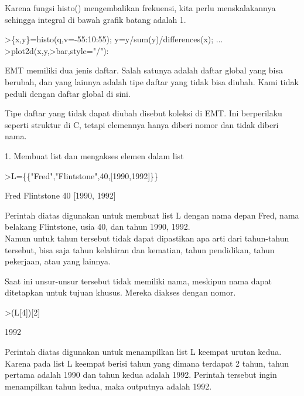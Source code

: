 \documentclass{article}
\begin{document}
\begin{eulernotebook}
\begin{eulercomment}
\begin{eulercomment}
\begin{eulercomment}
\begin{eulercomment}
\begin{eulercomment}
\begin{eulercomment}
\begin{eulercomment}
\begin{eulercomment}
\begin{eulercomment}
\begin{eulercomment}
\begin{eulercomment}
Karena fungsi histo() mengembalikan frekuensi, kita perlu
menskalakannya sehingga integral di bawah grafik batang adalah 1.
\end{eulercomment}
\begin{eulerprompt}
>\{x,y\}=histo(q,v=-55:10:55); y=y/sum(y)/differences(x); ...
>plot2d(x,y,>bar,style="/"):
\end{eulerprompt}
\begin{eulercomment}
\begin{eulercomment}
\begin{eulercomment}
EMT memiliki dua jenis daftar. Salah satunya adalah daftar global yang
bisa berubah, dan yang lainnya adalah tipe daftar yang tidak bisa
diubah. Kami tidak peduli dengan daftar global di sini.

Tipe daftar yang tidak dapat diubah disebut koleksi di EMT. Ini
berperilaku seperti struktur di C, tetapi elemennya hanya diberi nomor
dan tidak diberi nama.

1. Membuat list dan mengakses elemen dalam list
\end{eulercomment}
\begin{eulerprompt}
>L=\{\{"Fred","Flintstone",40,[1990,1992]\}\}
\end{eulerprompt}
\begin{euleroutput}
  Fred
  Flintstone
  40
  [1990,  1992]
\end{euleroutput}
\begin{eulercomment}
Perintah diatas digunakan untuk membuat list L dengan nama depan Fred,
nama belakang Flintstone, usia 40, dan tahun 1990, 1992.\\
Namun untuk tahun tersebut tidak dapat dipastikan apa arti dari
tahun-tahun tersebut, bisa saja tahun kelahiran dan kematian, tahun
pendidikan, tahun pekerjaan, atau yang lainnya.

Saat ini unsur-unsur tersebut tidak memiliki nama, meskipun nama dapat
ditetapkan untuk tujuan khusus. Mereka diakses dengan nomor.
\end{eulercomment}
\begin{eulerprompt}
>(L[4])[2]
\end{eulerprompt}
\begin{euleroutput}
  1992
\end{euleroutput}
\begin{eulercomment}
Perintah diatas digunakan untuk menampilkan list L keempat urutan
kedua. Karena pada list L keempat berisi tahun yang dimana terdapat 2
tahun, tahun pertama adalah 1990 dan tahun kedua adalah 1992. Perintah
tersebut ingin menampilkan tahun kedua, maka outputnya adalah 1992.


\end{eulercomment}
\end{eulercomment}
\end{eulercomment}
\end{eulercomment}
\end{eulercomment}
\end{eulercomment}
\end{eulercomment}
\end{eulercomment}
\end{eulercomment}
\end{eulercomment}
\end{eulercomment}
\end{eulercomment}
\end{eulercomment}
\end{eulernotebook}
\end{document}
